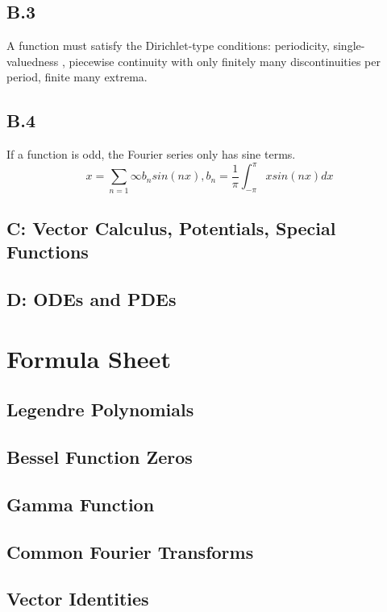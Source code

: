 \documentclass[11pt, letterpaper]{article}
\theoremstyle{plain}
\begin{document}
\subsection{B.3}
A function must satisfy the Dirichlet-type conditions: periodicity, single-valuedness
, piecewise continuity with only finitely many discontinuities per period, finite many extrema.
\subsection{B.4}
If a function is odd, the Fourier series only has sine terms.
\[
x = \sum_{n=1}{\infty} b_nsin(nx), b_n= \frac{1}{\pi} \int_{-\pi}^{\pi} xsin(nx)dx
\]
\subsection{C: Vector Calculus, Potentials, Special Functions}

\subsection{D: ODEs and PDEs}
\appendix
\section{Formula Sheet}

\subsection*{Legendre Polynomials}



\subsection*{Bessel Function Zeros}



\subsection*{Gamma Function}



\subsection*{Common Fourier Transforms}



\subsection*{Vector Identities}
\end{document}
